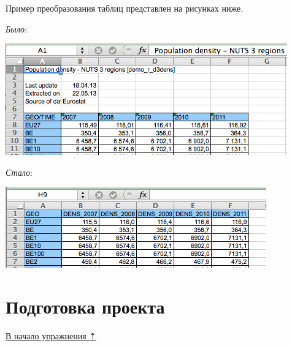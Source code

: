\documentclass[12pt,]{book}
\begin{document}
Пример преобразования таблиц представлен на рисунках ниже.

\emph{Было}:

\includegraphics{images/Ex08/image15.png}

\emph{Стало}:

\includegraphics{images/Ex08/image16.png}

\hypertarget{stat-map-economic-prepare}{%
\section{Подготовка проекта}\label{stat-map-economic-prepare}}

\protect\hyperlink{stat-map-economic}{В начало упражнения ⇡}
\end{document}
